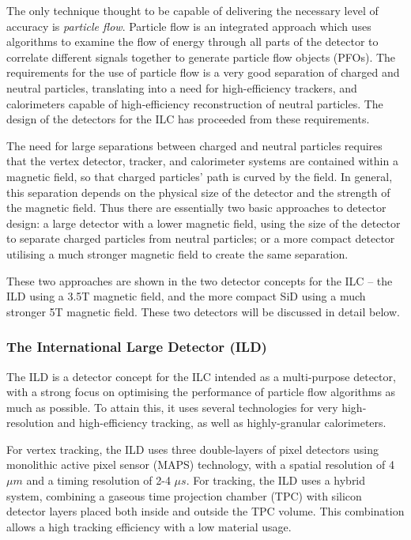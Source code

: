 The only technique thought to be capable of delivering the necessary level of accuracy is \textit{particle flow}. Particle flow is an integrated approach which uses algorithms to examine the flow of energy through all parts of the detector to correlate different signals together to generate particle flow objects (\acrshort{PFO}s). The requirements for the use of particle flow is a very good separation of charged and neutral particles, translating into a need for high-efficiency trackers, and calorimeters capable of high-efficiency reconstruction of neutral particles. The design of the detectors for the \acrshort{ILC} has proceeded from these requirements.

The need for large separations between charged and neutral particles requires that the vertex detector, tracker, and calorimeter systems are contained within a magnetic field, so that charged particles' path is curved by the field. In general, this separation depends on the physical size of the detector and the strength of the magnetic field. Thus there are essentially two basic approaches to detector design: a large detector with a lower magnetic field, using the size of the detector to separate charged particles from neutral particles; or a more compact detector utilising a much stronger magnetic field to create the same separation.

These two approaches are shown in the two detector concepts for the \acrshort{ILC} -- the \acrlong{ILD} using a 3.5T magnetic field, and the more compact \acrlong{SiD} using a much stronger 5T magnetic field. These two detectors will be discussed in detail below.

\subsubsection{The International Large Detector (ILD)}

The \acrfull{ILD} is a detector concept for the \acrshort{ILC} intended as a multi-purpose detector, with a strong focus on optimising the performance of particle flow algorithms as much as possible. To attain this, it uses several technologies for very high-resolution and high-efficiency tracking, as well as highly-granular calorimeters.

For vertex tracking, the \acrshort{ILD} uses three double-layers of pixel detectors using monolithic active pixel sensor (\acrshort{MAPS}) technology, with a spatial resolution of 4 $\mu m$ and a timing resolution of 2-4 $\mu s$. For tracking, the \acrshort{ILD} uses a hybrid system, combining a gaseous time projection chamber (\acrshort{TPC}) with silicon detector layers placed both inside and outside the \acrshort{TPC} volume. This combination allows a high tracking efficiency with a low material usage.


